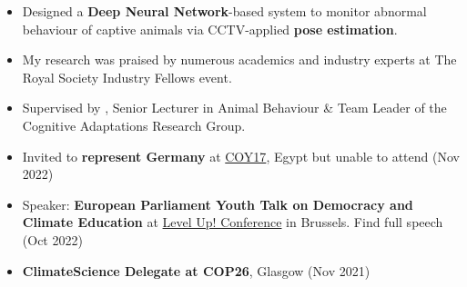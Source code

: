 \documentclass[10pt,a4paper,ragged2e,withhyper]{altacv}
\begin{document}
\begin{paracol}{2}



\begin{itemize}
    \item Designed a \textbf{Deep Neural Network}-based system to monitor abnormal behaviour of captive animals via CCTV-applied \textbf{pose estimation}.
    \item My research was praised by numerous academics and industry experts at The Royal Society Industry Fellows event.
    \item Supervised by , Senior Lecturer in Animal Behaviour \& Team Leader of the Cognitive Adaptations Research Group.
\end{itemize}

\begin{itemize}
    \item Invited to \textbf{represent Germany} at \href{https://coy17eg.com/}{COY17}, Egypt but unable to attend (Nov 2022)
    \item Speaker: \textbf{European Parliament Youth Talk on Democracy and Climate Education} at \href{https://www.levelup22.eu}{Level Up! Conference} in Brussels. Find full speech  (Oct 2022)
    \item \textbf{ClimateScience Delegate at COP26}, Glasgow (Nov 2021)
\end{itemize}


\end{paracol}
\end{document}
